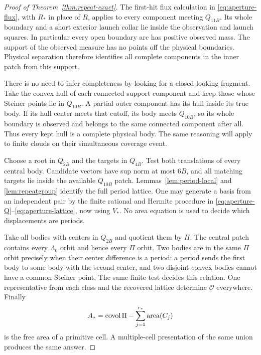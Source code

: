\begin{proof}[Proof of Theorem~\ref{thm:repeat-exact}]
The first-hit flux calculation in \eqref{eq:aperture-flux}, with $R_*$
in place of $R$, applies to every component meeting $Q_{11B}$.
Its whole boundary and a short exterior launch collar lie inside the
observation and launch squares. In particular every open boundary arc
has positive observed mass. The support of the observed measure has
no points off the physical boundaries. Physical separation therefore
identifies all complete components in the inner patch from this support.

There is no need to infer completeness by looking for a closed-looking
fragment. Take the convex hull of each connected support component and
keep those whose Steiner points lie in $Q_{10B}$. A partial outer
component has its hull inside its true body. If its hull center meets
that cutoff, its body meets $Q_{10B}$, so its whole boundary is observed
and belongs to the same connected component after all. Thus every kept
hull is a complete physical body. The same reasoning will apply to
finite clouds on their simultaneous coverage event.

Choose a root in $Q_{2B}$ and the targets in $Q_{4B}$. Test both
translations of every central body. Candidate vectors have sup norm at
most $6B$, and all matching targets lie inside the available $Q_{10B}$
patch. Lemmas~\ref{lem:period-local} and \ref{lem:repeatgroup} identify
the full period lattice. One may generate a basis from an independent
pair by the finite rational and Hermite procedure in
\eqref{eq:aperture-Q}--\eqref{eq:aperture-lattice}, now using $V_*$.
No area equation is used to decide which displacements are periods.

Take all bodies with centers in $Q_{2B}$ and quotient them by $\Pi$.
The central patch contains every $\Lambda_0$ orbit and hence every
$\Pi$ orbit. Two bodies are in the same $\Pi$ orbit precisely when
their center difference is a period: a period sends the first body to
some body with the second center, and two disjoint convex bodies cannot
have a common Steiner point. The same finite test decides this relation.
One representative from each class and the recovered lattice determine
$\mathcal O$ everywhere. Finally
\begin{equation}\label{eq:repeat-area}
           A_*=\operatorname{covol}\Pi-\sum_{j=1}^{r_*}\operatorname{area}(C_j)
\end{equation}
is the free area of a primitive cell. A multiple-cell presentation of
the same union produces the same answer.
\end{proof}

